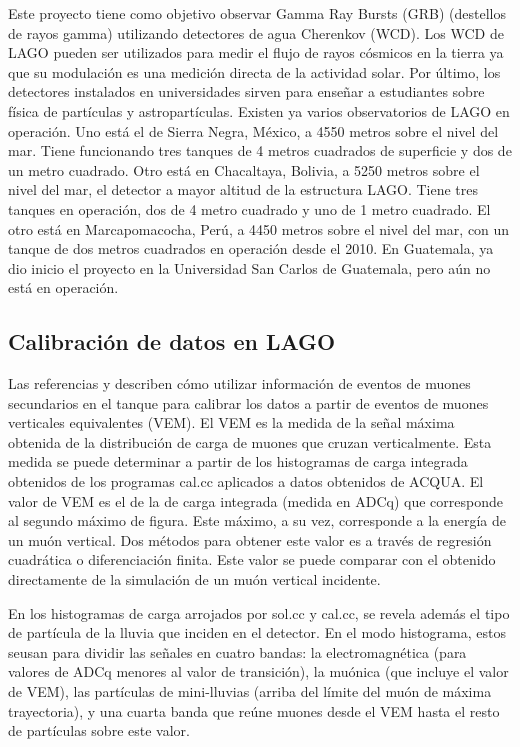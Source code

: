 \documentclass{book}
\begin{document}
Este proyecto tiene como objetivo observar Gamma Ray Bursts (GRB) (destellos de rayos gamma) utilizando detectores de agua Cherenkov (WCD). Los WCD de LAGO pueden ser utilizados para medir el flujo de rayos c\'osmicos en la tierra ya que su modulaci\'on es una medici\'on directa de la actividad solar. Por \'ultimo, los detectores instalados en universidades sirven para ense\~nar a estudiantes sobre f\'isica de part\'iculas y astropart\'iculas. Existen ya varios observatorios de LAGO en operaci\'on. Uno est\'a el de Sierra Negra, M\'exico, a 4550 metros sobre el nivel del mar. Tiene funcionando tres tanques de 4 metros cuadrados de superficie y dos de un metro cuadrado. Otro est\'a en Chacaltaya, Bolivia, a 5250 metros sobre el nivel del mar, el detector a mayor altitud de la estructura LAGO. Tiene tres tanques en operaci\'on, dos de 4 metro cuadrado y uno de 1 metro cuadrado. El otro est\'a en Marcapomacocha, Per\'u, a 4450 metros sobre el nivel del mar, con un tanque de dos metros cuadrados en operaci\'on desde el 2010. En Guatemala, ya dio inicio el proyecto en la Universidad San Carlos de Guatemala, pero a\'un no est\'a en operaci\'on. \citep{VILLASENOR}

\subsection{Calibraci\'on de datos en LAGO}

Las referencias \citep{ALLISON} y \citep{ALARCON} describen c\'omo utilizar informaci\'on de eventos de muones secundarios en el tanque para calibrar los datos a partir de eventos de muones verticales equivalentes (VEM). El VEM es la medida de la se\~nal m\'axima obtenida de la distribuci\'on de carga de muones que cruzan verticalmente. Esta medida se puede determinar a partir de los histogramas de carga integrada obtenidos de los programas cal.cc aplicados a datos obtenidos de ACQUA. El valor de VEM es el de la de carga integrada (medida en ADCq) que corresponde al segundo m\'aximo de figura. Este m\'aximo, a su vez, corresponde a la energ\'ia de un mu\'on vertical. Dos m\'etodos para obtener este valor es a trav\'es de regresi\'on cuadr\'atica o diferenciaci\'on finita. Este valor se puede comparar con el obtenido directamente de la simulaci\'on de un mu\'on vertical incidente.

En los histogramas de carga arrojados por sol.cc y cal.cc, se revela adem\'as el tipo de part\'icula de la lluvia que inciden en el detector. En el modo histograma, estos seusan para dividir las se\~nales en cuatro bandas: la electromagn\'etica (para valores de ADCq menores al valor de transici\'on), la mu\'onica (que incluye el valor de VEM), las part\'iculas de mini-lluvias (arriba del l\'imite del mu\'on de m\'axima trayectoria), y una cuarta banda que re\'une muones desde el VEM hasta el resto de part\'iculas sobre este valor. \citep{Yunior}
\end{document}
